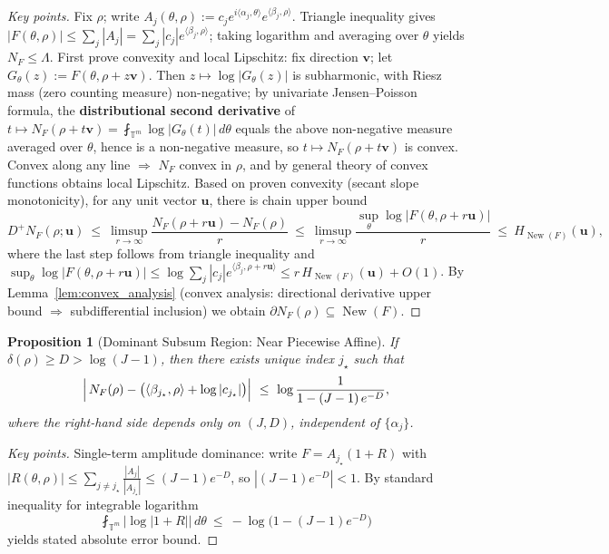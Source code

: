 \documentclass[11pt,a4paper]{article}
\newtheorem{proposition}[theorem]{Proposition}
\theoremstyle{remark}
\DeclareMathOperator{\New}{New}
\begin{document}
\begin{proof}[Key points]
Fix $\rho$; write $A_j(\theta,\rho):=c_j e^{i\langle\alpha_j,\theta\rangle}e^{\langle\beta_j,\rho\rangle}$. Triangle inequality gives $|F(\theta,\rho)|\le\sum_j|A_j|=\sum_j|c_j|e^{\langle\beta_j,\rho\rangle}$; taking logarithm and averaging over $\theta$ yields $N_F\le\Lambda$. First prove convexity and local Lipschitz: fix direction $\mathbf{v}$; let $G_\theta(z):=F(\theta,\rho+z\mathbf{v})$. Then $z\mapsto\log|G_\theta(z)|$ is subharmonic, with Riesz mass (zero counting measure) non-negative; by univariate Jensen--Poisson formula, the \textbf{distributional second derivative} of $t\mapsto N_F(\rho+t\mathbf{v})=\fint_{\mathbb{T}^m}\log|G_\theta(t)|\,d\theta$ equals the above non-negative measure averaged over $\theta$, hence is a non-negative measure, so $t\mapsto N_F(\rho+t\mathbf{v})$ is convex. Convex along any line $\Rightarrow$ $N_F$ convex in $\rho$, and by general theory of convex functions obtains local Lipschitz. Based on proven convexity (secant slope monotonicity), for any unit vector $\mathbf{u}$, there is chain upper bound
\begin{equation}
D^{+}N_F(\rho;\mathbf{u})
\ \le\ \limsup_{r\to\infty}\frac{N_F(\rho+r\mathbf{u})-N_F(\rho)}{r}
\ \le\ \limsup_{r\to\infty}\frac{\sup_{\theta}\log|F(\theta,\rho+r\mathbf{u})|}{r}
\ \le\ H_{\New(F)}(\mathbf{u}),
\end{equation}
where the last step follows from triangle inequality and
$\sup_{\theta}\log|F(\theta,\rho+r\mathbf{u})|\le \log\sum_j |c_j|e^{\langle\beta_j,\rho+r\mathbf{u}\rangle}
\le r\,H_{\New(F)}(\mathbf{u})+O(1)$. By Lemma~\ref{lem:convex_analysis} (convex analysis: directional derivative upper bound $\Rightarrow$ subdifferential inclusion) we obtain $\partial N_F(\rho)\subseteq\New(F)$.
\end{proof}

\begin{proposition}[Dominant Subsum Region: Near Piecewise Affine]\label{prop:piecewise}
If $\delta(\rho)\ge D>\log(J-1)$, then there exists unique index $j_\star$ such that
\begin{equation}
\Bigl|\,N_F(\rho)-\bigl(\langle\beta_{j_\star},\rho\rangle+\log|c_{j_\star}|\bigr)\Bigr|
\ \le\ \log\frac{1}{1-(J-1)\,e^{-D}} ,
\end{equation}
where the right-hand side depends only on $(J,D)$, independent of $\{\alpha_j\}$.
\end{proposition}

\begin{proof}[Key points]
Single-term amplitude dominance: write $F=A_{j_\star}(1+R)$ with $|R(\theta,\rho)|\le\sum_{j\ne j_\star}\frac{|A_j|}{|A_{j_\star}|}\le(J-1)e^{-D}$, so $|(J-1)e^{-D}|<1$. By standard inequality for integrable logarithm
\begin{equation*}
\fint_{\mathbb{T}^m}\bigl|\log|1+R|\bigr|\,d\theta\ \le\ -\log\bigl(1-(J-1)e^{-D}\bigr)
\end{equation*}
yields stated absolute error bound.
\end{proof}
\end{document}
